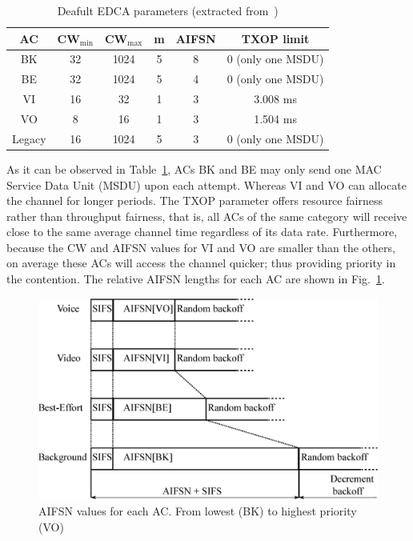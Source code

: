 	\begin{table}[t]
		\centering
		\caption{Deafult EDCA parameters (extracted from~\cite{perahia2013next})}
		\label{tab:EDCAparams}
		\begin{tabular}{|c|c|c|c|c|c|}
			\hline
			{\bfseries AC} & {\bfseries CW$_{\min}$} & {\bfseries CW$_{\max}$} &		{\bfseries m}		& {\bfseries AIFSN} & {\bfseries TXOP limit}\\
			\hline
			BK 		       & 		32			&		1024		   &			5			& 		8		  &		0 (only one MSDU)\\
			BE 		       & 		32			&		1024		   &			5			& 		4		  &		0 (only one MSDU)	\\
			VI 		       & 		16			&		32		  	   &			1			& 		3		  &		3.008 ms		\\
			VO 		       & 		8			&		16		  	   &			1			& 		3		  &		1.504 ms		\\
			Legacy	       & 		16			&		1024	  	   &			5			& 		3		  &		0 (only one MSDU)\\
			\hline
		\end{tabular}
	\end{table}

As it can be observed in Table~\ref{tab:EDCAparams}, ACs BK and BE may only send one MAC Service Data Unit (MSDU) upon each attempt. Whereas VI and VO can allocate the channel for longer periods. The TXOP parameter offers resource fairness rather than throughput fairness, that is, all ACs of the same category will receive close to the same average channel time regardless of its data rate. Furthermore, because the CW and AIFSN values for VI and VO are smaller than the others, on average these ACs will access the channel quicker; thus providing priority in the contention. The relative AIFSN lengths for each AC are shown in Fig.~\ref{fig:AIFSN}.

	\begin{figure}[t]
	\centering
		\includegraphics[width=0.7\linewidth]{figures/AIFSN.eps}
		\caption{AIFSN values for each AC. From lowest (BK) to highest priority (VO)}
		\label{fig:AIFSN}
	\end{figure}

